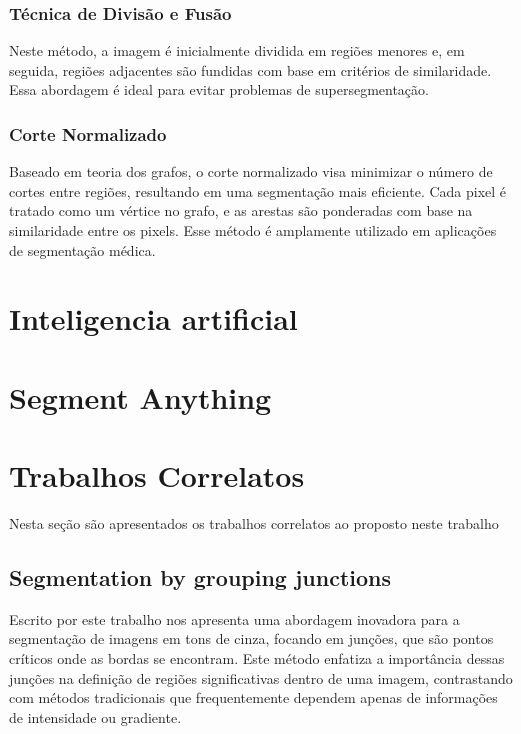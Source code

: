\subsubsection{Técnica de Divisão e Fusão}
Neste método, a imagem é inicialmente dividida em regiões menores e, em seguida, regiões adjacentes são fundidas com base em critérios de similaridade. Essa abordagem é ideal para evitar problemas de supersegmentação.

\subsubsection{Corte Normalizado}
Baseado em teoria dos grafos, o corte normalizado visa minimizar o número de cortes entre regiões, resultando em uma segmentação mais eficiente. Cada pixel é tratado como um vértice no grafo, e as arestas são ponderadas com base na similaridade entre os pixels. Esse método é amplamente utilizado em aplicações de segmentação médica.

\section{Inteligencia artificial}

\section{Segment Anything}



\section{Trabalhos Correlatos}

Nesta seção são apresentados os trabalhos correlatos ao proposto neste trabalho

\subsection{Segmentation by grouping junctions}

Escrito por  este trabalho nos apresenta uma abordagem inovadora para a segmentação de imagens em tons de cinza, focando em junções, que são pontos críticos onde as bordas se encontram. 
Este método enfatiza a importância dessas junções na definição de regiões significativas dentro de uma imagem, contrastando com métodos tradicionais que frequentemente dependem apenas de informações de intensidade ou gradiente.


